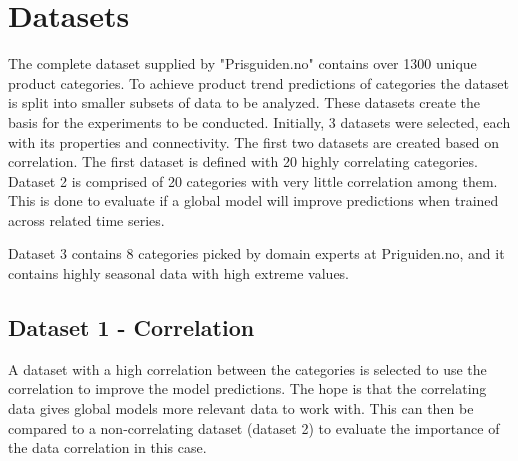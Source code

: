 \section{Datasets}
\label{section:Data:Dataset}

The complete dataset supplied by "Prisguiden.no" contains over 1300 unique product categories.
To achieve product trend predictions of categories the dataset is split into smaller subsets of data to be analyzed.
These datasets create the basis for the experiments to be conducted.
Initially, 3 datasets were selected, each with its properties and connectivity.
The first two datasets are created based on correlation.
The first dataset is defined with 20 highly correlating categories.
Dataset 2 is comprised of 20 categories with very little correlation among them.
This is done to evaluate if a global model will improve
predictions when trained across related time series.

Dataset 3 contains 8 categories picked by domain experts at Priguiden.no, and it contains highly seasonal data with high extreme values.


\subsection{Dataset 1 - Correlation}

A dataset with a high correlation between the categories is selected to use the correlation to improve the model predictions.
The hope is that the correlating data gives global models more relevant data to work with.
This can then be compared to a non-correlating dataset (dataset 2) to evaluate the importance of the data correlation in this case.

